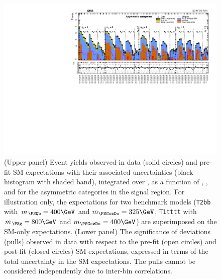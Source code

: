 \begin{figure}[!hbt]
  \centering
    \includegraphics[width=\cmsFigWidthTwo]{Figure_004.pdf}
    \caption{(Upper panel) Event yields observed in data (solid
      circles) and pre-fit SM expectations with their associated
      uncertainties (black histogram with shaded band), integrated
      over \HTmiss, as a function of \njet, \nb, and \scalht for the
      asymmetric \njet categories in the signal region. For
      illustration only, the expectations for two benchmark models
      (\texttt{T2bb} with $m_{\,\PSQb} = 400\GeV$ and $m_{\PSGczDo} =
      325\GeV$, \texttt{T1tttt} with $m_{\,\PSg} = 800\GeV$ and
      $m_{\PSGczDo} = 400\GeV$) are superimposed on the SM-only
      expectations. (Lower panel) The significance of deviations
      (pulls) observed in data with respect to the pre-fit (open
      circles) and post-fit (closed circles) SM expectations,
      expressed in terms of the total uncertainty in the SM
      expectations. The pulls cannot be considered independently due
      to inter-bin correlations.}
    \label{fig:asym}
\end{figure}

